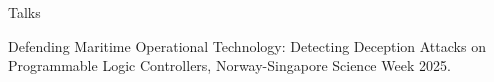 Talks

Defending Maritime Operational Technology: Detecting Deception Attacks on Programmable Logic Controllers, Norway-Singapore Science Week 2025.